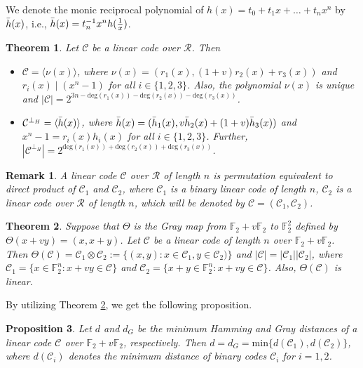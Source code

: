 \documentclass[pdflatex,sn-mathphys-num]{sn-jnl}%
\theoremstyle{thmstyleone}%
\newtheorem{theorem}{Theorem}%
\newtheorem{proposition}[theorem]{Proposition}%
\theoremstyle{thmstyletwo}%
\newtheorem{remark}{Remark}%
\theoremstyle{thmstylethree}%
\begin{document}
\noindent We denote the monic reciprocal polynomial of $h(x)=t_0+t_1x+\dots +t_nx^n$ by $\Bar{h}(x)$, i.e., $\Bar{h}(x)=t_n^{-1}x^{n}h(\frac{1}{x})$.

\begin{theorem}\cite{cyclicF2}\label{7.1}
Let $\mathcal{C}$ be a linear code over $\mathcal{R}$. Then
\begin{itemize}
\item[(i)] $\mathcal{C}=\langle \nu(x)\rangle$, where $\nu(x)=(r_1(x),(1+v)r_2(x)+r_3(x))$ and $r_i(x)\mid (x^n-1)$ for all $i\in \{1,2,3\}$. Also, the polynomial $\nu(x)$ is unique and $|\mathcal{C}|=2^{3n-\mathrm{deg}(r_1(x))-\mathrm{deg}(r_2(x))-\mathrm{deg}(r_3(x))}$.
\item[(ii)] $\mathcal{C}^{\perp_H}=\langle \Bar{h}(x)\rangle$, where $\Bar{h}(x)=(\Bar{h}_1(x),v\Bar{h}_2(x)+(1+v)\Bar{h}_3(x))$ and $x^n-1=r_i(x)h_i(x)$ for all $i\in \{1,2,3\}$. Further, $|\mathcal{C}^{\perp_H}|=2^{\mathrm{deg}(r_1(x))+\mathrm{deg}(r_2(x))+\mathrm{deg}(r_3(x))}$.
\end{itemize}
\end{theorem}

\begin{remark}\cite{F2ring}\label{remark7.1}
A linear code $\mathcal{C}$ over $\mathcal{R}$ of length $n$ is permutation equivalent to direct product of $\mathcal{C}_1 $ and $ \mathcal{C}_2$, where $\mathcal{C}_1$ is a binary linear code of length $n$, $\mathcal{C}_2$ is a linear code over $\mathcal{R}$ of length $n$, which will be denoted by $\mathcal{C}= (\mathcal{C}_1,\mathcal{C}_2)$.
\end{remark}

\begin{theorem}\cite{cyclicinring}\label{th7.2}
Suppose that $\Theta$ is the Gray map from $\mathbb{F}_2+v\mathbb{F}_2$ to $\mathbb{F}_2^2$ defined by $\Theta(x+vy)=(x,x+y)$. Let $\mathcal{C}$ be a linear code of length $n$ over $\mathbb{F}_2+v\mathbb{F}_2$.
Then $\Theta(\mathcal{C})=\mathcal{C}_1 \otimes \mathcal{C}_2:=\{(x,y):x\in\mathcal{C}_1,y\in\mathcal{C}_2)\}$ and $|\mathcal{C}|=|\mathcal{C}_1||\mathcal{C}_2|$, where $\mathcal{C}_1=\{x\in\mathbb{F}_2^n : x+vy \in\mathcal{C}\}$ and $\mathcal{C}_2=\{x+y\in\mathbb{F}_2^n : x+vy \in\mathcal{C}\}$. Also, $\Theta(\mathcal{C})$ is linear.
\end{theorem}

\noindent By utilizing Theorem \ref{th7.2}, we get the following proposition.

\begin{proposition}\label{prop1}
Let $d$ and $d_G$ be the minimum Hamming and Gray distances of a linear code $\mathcal{C}$ over $\mathbb{F}_2+v\mathbb{F}_2$, respectively. Then $d=d_G=\mathrm{min}\{d(\mathcal{C}_1),d(\mathcal{C}_2)\}$, where $d(\mathcal{C}_i)$ denotes the
minimum distance of binary codes $\mathcal{C}_i$ for $i=1,2$.
\end{proposition}
\end{document}
